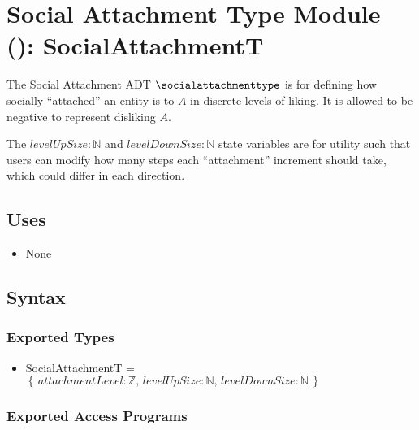 \section{Social Attachment Type Module ():
SocialAttachmentT}\label{socialModule}

The Social Attachment ADT $\socialattachmenttype$ is for defining how socially
``attached'' an entity is to $A$ in discrete levels of liking. It is allowed to
be negative to represent disliking $A$.

The $\mathit{levelUpSize} : \mathbb{N}$ and $\mathit{levelDownSize} :
\mathbb{N}$ state variables are for utility such that users can modify how many
steps each ``attachment'' increment should take, which could differ in each
direction.

\subsection{Uses}
\begin{itemize}[noitemsep, nosep]

    \item None

\end{itemize}

\subsection{Syntax}

\subsubsection{Exported Types}
\begin{itemize}

    \item SocialAttachmentT = $\left\{ \, \mathit{attachmentLevel} :
    \mathbb{Z}, \, \mathit{levelUpSize} : \mathbb{N}, \, \mathit{levelDownSize}
    : \mathbb{N} \, \right\} $

\end{itemize}

\subsubsection{Exported Access Programs}

